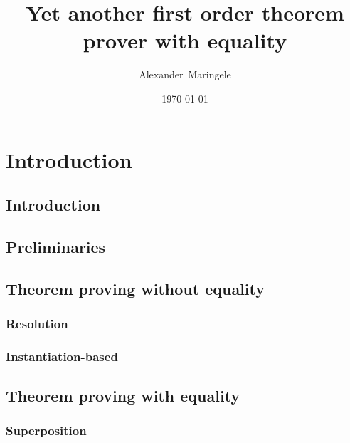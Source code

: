 \documentclass[]{clmthesis}
\begin{document}
\nocite{*}

\title{Yet another first order theorem prover with equality}
\author{Alexander~Maringele}
\date{\today}
\maketitle
\tableofcontents

\chapter{Introduction} 			
\section{Introduction}

\section{Preliminaries}
\section{Theorem proving without equality}
\subsection{Resolution}
\subsection{Instantiation-based}
\section{Theorem proving with equality}
\subsection{Superposition}
\end{document}
